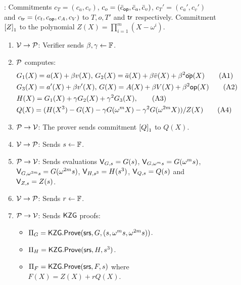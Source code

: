 \begin{figure}[htbp]
    \centering
    \begin{mdframed}
    {\footnotesize
    : Commitments $c_T=(c_a,c_v)$, $c_o=(\bar{c}_\op, \bar{c}_a, \bar{c}_v)$, $c_T'=(c_a', c_v')$
        and $c_\tr=(c_t, c_\op, c_A, c_V)$ to $T,o,T'$ and $\tr$ respectively. Commitment $\gone{Z}$ to the polynomial
        $Z(X)=\prod_{i=1}^m (X-\omega^i)$.
        \begin{enumerate}[leftmargin=2em]
            \item $\verifier\rightarrow\prover$: Verifier sends $\beta,\gamma\gets \F$.
            \item $\prover$ computes:
            \begin{align}\label{eq:poly-constraints}
            & G_1(X) = a(X) + \beta v(X),\, G_2(X) = \bar{a}(X) + \beta \bar{v}(X) + \beta^2 \bar{\op}(X) \tag{A1} \\
            & G_3(X) = a'(X) + \beta v'(X),\, G(X) = A(X) + \beta V(X) + \beta^2 \op(X) \tag{A2} \\
            & H(X) = G_1(X) + \gamma G_2(X) + \gamma^2 G_3(X), \tag{A3} \\
            & Q(X) = (H(X^3) - G(X) - \gamma G(\omega^m X) - \gamma^2 G(\omega^{2m} X))/Z(X) \tag{A4}
            \end{align}
            \item $\prover\rightarrow\verifier$: The prover sends commitment $\gone{Q}$ to $Q(X)$.
            \item $\verifier\rightarrow\prover$: Sends $s\gets\F$.
            \item $\prover\rightarrow\verifier$: Sends evaluations $\val{s}{G}=G(s)$, $\val{\omega^m s}{G}=G(\omega^m s)$,
            $\val{\omega^{2m}s}{G}=G(\omega^{2m} s)$, $\val{s^3}{H}=H(s^3)$, $\val{s}{Q}=Q(s)$ and $\val{s}{Z}=Z(s)$.
            \item $\verifier\rightarrow\prover$: Sends $r\gets\F$.
            \item $\prover\rightarrow\verifier$: Sends $\kzg$ proofs:
            \begin{itemize}[leftmargin=2em]
                \item $\Pi_G=\kzgprove(\srs,G,(s,\omega^m s, \omega^{2m}s))$.
                \item $\Pi_H=\kzgprove(\srs,H,s^3)$.
                \item $\Pi_F=\kzgprove(\srs,F,s)$ where $F(X)=Z(X) + rQ(X)$.

\end{itemize}
\end{enumerate}}
\end{mdframed}
\end{figure}
